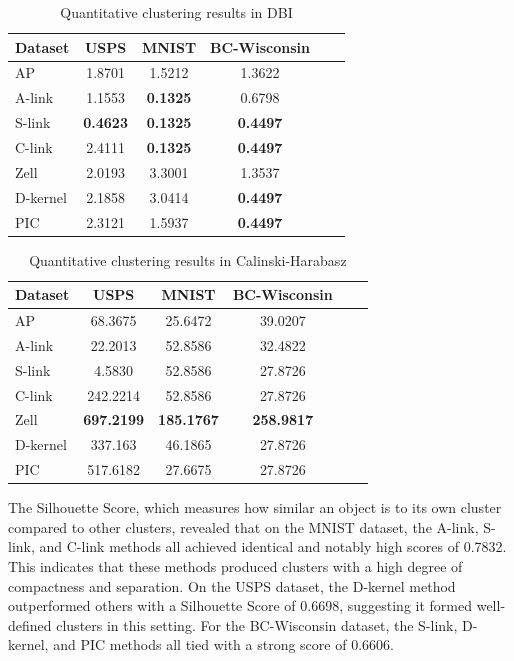 \documentclass[
	10pt,
	parskip=half-,	
	paper=a4,
	english
	]{scrartcl}
\begin{document}
\begin{table}[h]
    \centering
    \caption{Quantitative clustering results in DBI}
    \begin{tabular}{lccccc}
    \toprule
    \textbf{Dataset} & \textbf{USPS} & \textbf{MNIST} & \textbf{BC-Wisconsin} \\
    \midrule
    AP       & 1.8701   & 1.5212 & 1.3622 \\
    A-link   & 1.1553  & \textbf{0.1325} & 0.6798 \\
    S-link   & \textbf{0.4623}   & \textbf{0.1325} & \textbf{0.4497} \\
    C-link   & 2.4111   & \textbf{0.1325} & \textbf{0.4497} \\
    Zell     & 2.0193   & 3.3001 & 1.3537 \\
    D-kernel & 2.1858   & 3.0414 & \textbf{0.4497} \\
    PIC     & 2.3121    & 1.5937 & \textbf{0.4497} \\
    \bottomrule
    \end{tabular}
    \label{tab:DBI}
\end{table}

\begin{table}[h]
    \centering
    \caption{Quantitative clustering results in Calinski-Harabasz}
    \begin{tabular}{lccccc}
    \toprule
    \textbf{Dataset} & \textbf{USPS} & \textbf{MNIST} & \textbf{BC-Wisconsin} \\
    \midrule
    AP       & 68.3675   & 25.6472 & 39.0207 \\
    A-link   & 22.2013  & 52.8586 & 32.4822   \\
    S-link   & 4.5830   & 52.8586 & 27.8726 \\
    C-link   & 242.2214   & 52.8586 & 27.8726 \\
    Zell     & \textbf{697.2199}   & \textbf{185.1767} & \textbf{258.9817} \\
    D-kernel & 337.163   & 46.1865 & 27.8726 \\
    PIC      & 517.6182 & 27.6675 & 27.8726 \\
    \bottomrule
    \end{tabular}
    \label{tab:CH}
\end{table}

The Silhouette Score, which measures how similar an object is to its own cluster compared to other clusters, revealed that on the MNIST dataset, the A-link, S-link, and C-link methods all achieved identical and notably high scores of 0.7832. This indicates that these methods produced clusters with a high degree of compactness and separation. On the USPS dataset, the D-kernel method outperformed others with a Silhouette Score of 0.6698, suggesting it formed well-defined clusters in this setting. For the BC-Wisconsin dataset, the S-link, D-kernel, and PIC methods all tied with a strong score of 0.6606.
\end{document}
